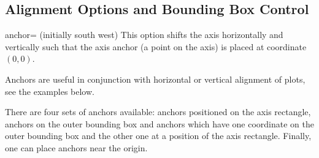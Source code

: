 \subsection{Alignment Options and Bounding Box Control}
\label{pgfplots:sec:align}

\begin{pgfplotskey}{anchor= (initially south west)}
\label{option:anchor}%
This option shifts the axis horizontally and vertically such that the axis anchor (a point on the axis) is placed at coordinate $(0,0)$.

Anchors are useful in conjunction with horizontal or vertical alignment of plots, see the examples below.

There are four sets of anchors available: anchors positioned on the axis rectangle, anchors on the outer bounding box and anchors which have one coordinate on the outer bounding box and the other one at a position of the axis rectangle. Finally, one can place anchors near the origin.


\end{pgfplotskey}
